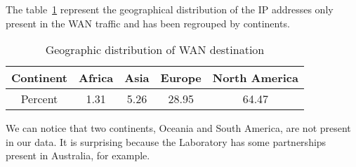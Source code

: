 \documentclass[10pt, conference, a4paper, twocolumns]{IEEEtran}
\begin{document}
The table~\ref{table:destination} represent the geographical distribution of the IP addresses only present in the WAN traffic and has been regrouped by continents. %
\begin{table}[ht!]
\centering
\caption{Geographic distribution of WAN destination}
\label{table:destination}
\begin{tabular}{|c|c|c|c|c|}
\hline
Continent & Africa & Asia & Europe & North America \\ \hline
Percent & 1.31 & 5.26 & 28.95 & 64.47 \\ \hline
\end{tabular}
\end{table}
We can notice that two continents, Oceania and South America, are not present in our data. It is surprising because the Laboratory has some partnerships present in Australia, for example.

\end{document}
